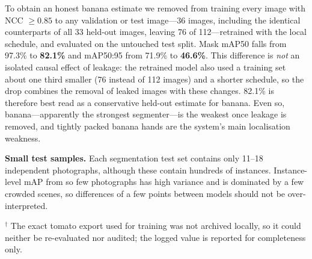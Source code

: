 \documentclass[10pt,twocolumn]{article}
\begin{document}
To obtain an honest banana estimate we removed from training every image with NCC $\ge 0.85$ to any validation or test image---36 images, including the identical counterparts of all 33 held-out images, leaving 76 of 112---retrained with the local schedule, and evaluated on the untouched test split. Mask mAP50 falls from 97.3\% to \textbf{82.1\%} and mAP50:95 from 71.9\% to \textbf{46.6\%}. This difference is \emph{not} an isolated causal effect of leakage: the retrained model also used a training set about one third smaller (76 instead of 112 images) and a shorter schedule, so the drop combines the removal of leaked images with these changes. 82.1\% is therefore best read as a conservative held-out estimate for banana. Even so, banana---apparently the strongest segmenter---is the weakest once leakage is removed, and tightly packed banana hands are the system's main localisation weakness.

\textbf{Small test samples.} Each segmentation test set contains only 11--18 independent photographs, although these contain hundreds of instances. Instance-level mAP from so few photographs has high variance and is dominated by a few crowded scenes, so differences of a few points between models should not be over-interpreted.

\begin{table}[t]
\centering\small
\caption{Stage-1 stall segmentation on the test split (mask mAP, \%). ``Logged'': reported at training time. ``Re-evaluated'': our local evaluation of the released weights. ``Dup.'': test images with a manually verified near-duplicate in training. ``Final'': the held-out estimate we stand behind.}
\label{tab:seg}
\par\vspace{3pt}
{\footnotesize\raggedright $^\dagger$ The exact tomato export used for training was not archived locally, so it could neither be re-evaluated nor audited; the logged value is reported for completeness only.\par}
\end{table}
\end{document}
